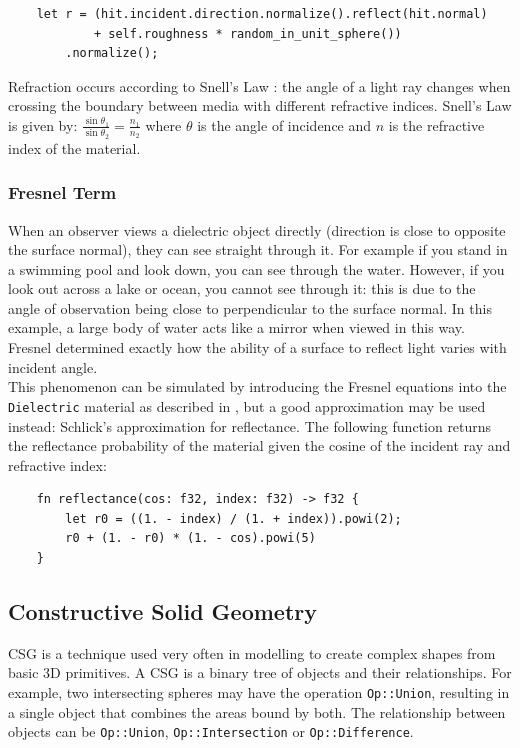 \documentclass[a4paper]{article}
\begin{document}
\begin{verbatim}
    let r = (hit.incident.direction.normalize().reflect(hit.normal)
            + self.roughness * random_in_unit_sphere())
        .normalize();
\end{verbatim}

Refraction occurs according to Snell's Law : the angle of a light ray changes when crossing the boundary between media with different refractive indices. Snell's Law is given by: $\frac{\sin \theta_{1}}{\sin \theta_{2}} = \frac{n_{1}}{n_{2}}$ where $\theta$ is the angle of incidence and $n$ is the refractive index of the material.

\subsubsection{Fresnel Term} When an observer views a dielectric object directly (direction is close to opposite the surface normal), they can see straight through it. For example if you stand in a swimming pool and look down, you can see through the water. However, if you look out across a lake or ocean, you cannot see through it: this is due to the angle of observation being close to perpendicular to the surface normal. In this example, a large body of water acts like a mirror when viewed in this way. Fresnel determined exactly how the ability of a surface to reflect light varies with incident angle.\\

This phenomenon can be simulated by introducing the Fresnel equations into the \texttt{Dielectric} material as described in \cite{Suffern2016ray}, but a good approximation may be used instead: Schlick's approximation \cite{Schlick1994approx} for reflectance. The following function returns the reflectance probability of the material given the cosine of the incident ray and refractive index:

\begin{verbatim}
    fn reflectance(cos: f32, index: f32) -> f32 {
        let r0 = ((1. - index) / (1. + index)).powi(2);
        r0 + (1. - r0) * (1. - cos).powi(5)
    }
\end{verbatim}

\subsection{Constructive Solid Geometry}
CSG is a technique used very often in modelling to create complex shapes from basic 3D primitives. A CSG is a binary tree of objects and their relationships. For example, two intersecting spheres may have the operation \texttt{Op::Union}, resulting in a single object that combines the areas bound by both. The relationship between objects can be \texttt{Op::Union}, \texttt{Op::Intersection} or \texttt{Op::Difference}.
\end{document}
